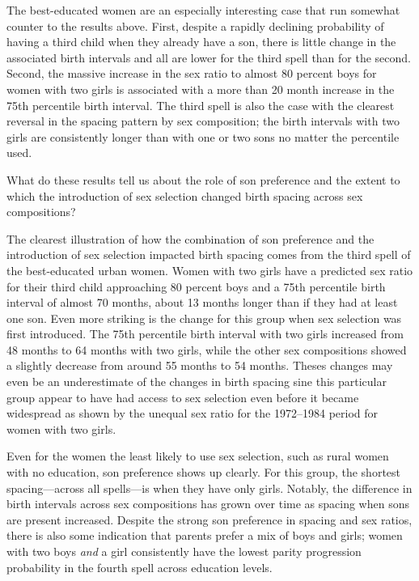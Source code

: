 \documentclass[12pt,letterpaper]{article}
\begin{document}
The best-educated women are an especially interesting case that run somewhat counter
to the results above.
First, despite a rapidly declining probability of having a third child when they already 
have a son, there is little change in the associated birth intervals and all are lower for 
the third spell than for the second.
Second, the massive increase in the sex ratio to almost 80 percent boys for women with two 
girls is associated with a more than 20 month increase in the 75th percentile birth 
interval.
The third spell is also the case with the clearest reversal in the spacing pattern by sex 
composition; the birth intervals with two girls are consistently longer than with one
or two sons no matter the percentile used.


What do these results tell us about the role of son preference and the extent to which 
the introduction of sex selection changed birth spacing across sex compositions? 

The clearest illustration of how the combination of son preference and the introduction of 
sex selection impacted birth spacing comes from the third spell of the best-educated urban 
women.
Women with two girls have a predicted sex ratio for their third child approaching 80 
percent boys and a 75th percentile birth interval of almost 70 months, about 13 months
longer than if they had at least one son.
Even more striking is the change for this group when sex selection was first introduced.
The 75th percentile birth interval with two girls increased from 48 months to 
64 months with two girls, while the other sex compositions showed a 
slightly decrease from around 55 months to 54 months.
Theses changes may even be an underestimate of the changes in birth spacing sine
this particular group appear to have had access to sex selection even before it became
widespread as shown by the unequal sex ratio for the 1972--1984 period for women with
two girls.

Even for the women the least likely to use sex selection, such as rural women with no 
education, son preference shows up clearly. 
For this group, the shortest spacing---across all spells---is when they have only girls. 
Notably, the difference in birth intervals across sex compositions has grown over 
time as spacing when sons are present increased.
Despite the strong son preference in spacing and sex ratios, there is also some indication 
that parents prefer a mix of boys and girls;
women with two boys \emph{and} a girl consistently have the lowest parity progression 
probability in the fourth spell across education levels. 
\end{document}
